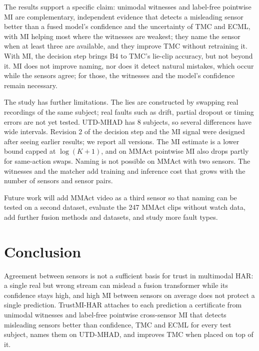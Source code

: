 \documentclass[conference]{IEEEtran}
\begin{document}
The results support a specific claim: unimodal witnesses and label-free pointwise MI are complementary, independent evidence that detects a misleading sensor better than a fused model's confidence and the uncertainty of TMC and ECML, with MI helping most where the witnesses are weakest; they name the sensor when at least three are available, and they improve TMC without retraining it. With MI, the decision step brings B4 to TMC's lie-clip accuracy, but not beyond it. MI does not improve naming, nor does it detect natural mistakes, which occur while the sensors agree; for those, the witnesses and the model's confidence remain necessary.

The study has further limitations. The lies are constructed by swapping real recordings of the same subject; real faults such as drift, partial dropout or timing errors are not yet tested. UTD-MHAD has 8 subjects, so several differences have wide intervals. Revision 2 of the decision step and the MI signal were designed after seeing earlier results; we report all versions. The MI estimate is a lower bound capped at $\log(K+1)$, and on MMAct pointwise MI also drops partly for same-action swaps. Naming is not possible on MMAct with two sensors. The witnesses and the matcher add training and inference cost that grows with the number of sensors and sensor pairs.

Future work will add MMAct video as a third sensor so that naming can be tested on a second dataset, evaluate the 247 MMAct clips without watch data, add further fusion methods and datasets, and study more fault types.

\section{Conclusion}

Agreement between sensors is not a sufficient basis for trust in multimodal HAR: a single real but wrong stream can mislead a fusion transformer while its confidence stays high, and high MI between sensors on average does not protect a single prediction. TrustMI-HAR attaches to each prediction a certificate from unimodal witnesses and label-free pointwise cross-sensor MI that detects misleading sensors better than confidence, TMC and ECML for every test subject, names them on UTD-MHAD, and improves TMC when placed on top of it.
\end{document}
